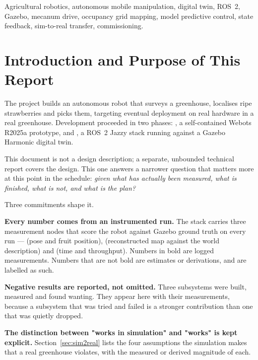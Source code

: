 \documentclass[conference]{IEEEtran}
\begin{document}
\begin{IEEEkeywords}
Agricultural robotics, autonomous mobile manipulation, digital twin, ROS~2,
Gazebo, mecanum drive, occupancy grid mapping, model predictive control,
state feedback, sim-to-real transfer, commissioning.
\end{IEEEkeywords}

\section{Introduction and Purpose of This Report}

The project builds an autonomous robot that surveys a greenhouse, localises
ripe strawberries and picks them, targeting eventual deployment on real
hardware in a real greenhouse. Development proceeded in two phases: \phaseA{},
a self-contained Webots R2025a prototype, and \phaseB{}, a ROS~2 Jazzy stack
running against a Gazebo Harmonic digital twin.

This document is not a design description; a separate, unbounded technical
report covers the design. This one answers a narrower question that matters
more at this point in the schedule: \emph{given what has actually been
measured, what is finished, what is not, and what is the plan?}

Three commitments shape it.

\textbf{Every number comes from an instrumented run.} The stack carries three
measurement nodes that score the robot against Gazebo ground truth on every
run ---  (pose and fruit position), 
(reconstructed map against the world description) and 
(time and throughput). Numbers in bold are logged measurements. Numbers that
are not bold are estimates or derivations, and are labelled as such.

\textbf{Negative results are reported, not omitted.} Three subsystems were
built, measured and found wanting. They appear here with their measurements,
because a subsystem that was tried and failed is a stronger contribution than
one that was quietly dropped.

\textbf{The distinction between "works in simulation" and "works" is kept
explicit.} Section~\ref{sec:sim2real} lists the four assumptions the simulation
makes that a real greenhouse violates, with the measured or derived magnitude
of each.
\end{document}
